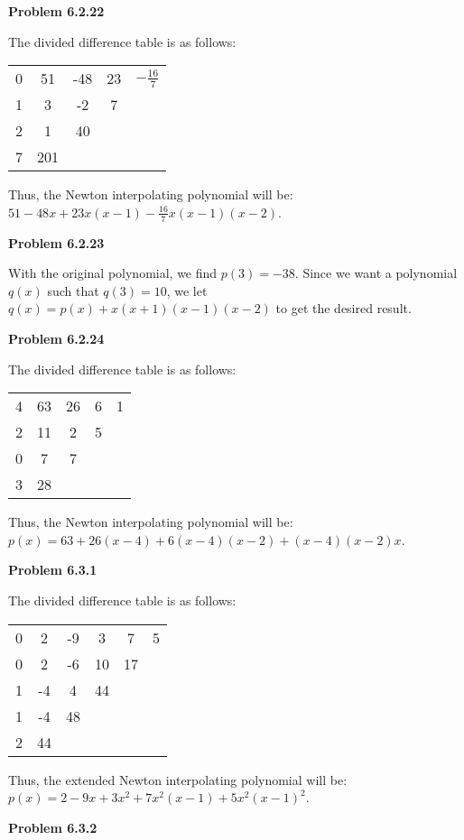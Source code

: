 \documentclass{article}
\newcommand{\Problem}[1]{\textbf{Problem #1}}
\begin{document}
\Problem{6.2.22}

The divided difference table is as follows:
\begin{center}
\begin{tabular}{cc|ccc}
	0 & 51 & -48 & 23 & $-\frac{16}{7}$\\
	1 & 3 & -2 & 7 & \\
	2 & 1 & 40 & & \\
	7 & 201 & & &
\end{tabular}
\end{center}

Thus, the Newton interpolating polynomial will be: $51 - 48x +23x(x-1) - \frac{16}{7}x(x-1)(x-2)$. 

\Problem{6.2.23}

With the original polynomial, we find $p(3) = -38$. Since we want a polynomial $q(x)$ such that $q(3) = 10$, we let $q(x) = p(x) + x(x+1)(x-1)(x-2)$ to get the desired result.

\Problem{6.2.24}

The divided difference table is as follows:
\begin{center}
\begin{tabular}{cc|ccc}
	4 & 63 & 26 & 6 & 1 \\
	2 & 11 & 2 & 5 & \\
	0 & 7 & 7 & & \\
	3 & 28 & & & \\	
\end{tabular}
\end{center}

Thus, the Newton interpolating polynomial will be: $p(x) = 63 + 26(x-4) + 6(x-4)(x-2) + (x-4)(x-2)x$.

\Problem{6.3.1}

The divided difference table is as follows:
\begin{center}
\begin{tabular}{cc|cccc}
	0 & 2 & -9 & 3 & 7 & 5 \\
	0 & 2 & -6 & 10 & 17 & \\
	1 & -4 & 4 & 44 & & \\
	1 & -4 & 48 & & & \\
	2 & 44 & & & & \\
\end{tabular}	
\end{center}

Thus, the extended Newton interpolating polynomial will be: $p(x) = 2 - 9x + 3x^2 + 7x^2(x-1) + 5x^2(x-1)^2$.

\Problem{6.3.2}
\end{document}
